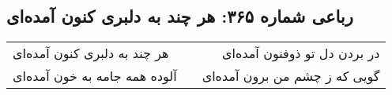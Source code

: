 \begin{center}
\section*{رباعی شماره ۳۶۵: هر چند به دلبری کنون آمده‌ای}
\label{sec:sh365}
\begin{longtable}{l p{0.5cm} r}
هر چند به دلبری کنون آمده‌ای
&&
در بردن دل تو ذوفنون آمده‌ای
\\
آلوده همه جامه به خون آمده‌ای
&&
گویی که ز چشم من برون آمده‌ای
\\
\end{longtable}
\end{center}
